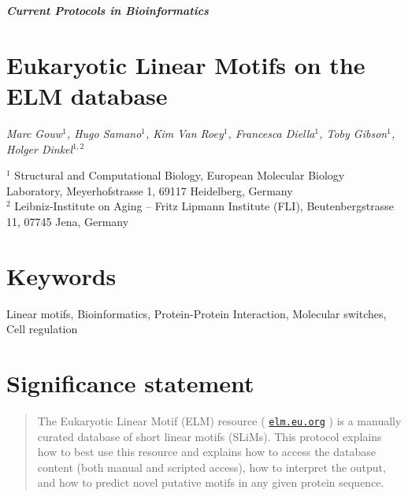 \documentclass[12pt]{article}
\newcounter{proto}
\newcommand\rurl[1]{%
	\href{http://#1}{\nolinkurl{#1}}%
}
\begin{document}

\thispagestyle{plain}
\begin{center}

\textbf{\LARGE \textit{Current Protocols in Bioinformatics}}\\\vspace{2mm}
\end{center}

\section*{Eukaryotic Linear Motifs on the ELM database}

{\small \it
Marc Gouw$^{1}$,
Hugo Samano$^{1}$,
Kim Van Roey$^{1}$,
Francesca Diella$^{1}$,
Toby Gibson$^{1}$,
Holger Dinkel$^{1,2}$

$^{1}$ Structural and Computational Biology, European Molecular Biology
Laboratory, Meyerhofstrasse 1, 69117 Heidelberg, Germany\\
$^{2}$ Leibniz-Institute on Aging -- Fritz Lipmann Institute (FLI),
Beutenbergstrasse 11, 07745 Jena, Germany
}

\section*{Keywords}

Linear motifs, Bioinformatics, Protein-Protein Interaction, Molecular
switches, Cell regulation

\section*{Significance statement}


\begin{abstract}


    The Eukaryotic Linear Motif (ELM) resource (\rurl{elm.eu.org}) is a
manually curated database of short linear motifs (SLiMs). This protocol
explains how to best use this resource and explains how to access the
database content (both manual and scripted access), how to interpret the
output, and how to predict novel putative motifs in any given protein
sequence.

\end{abstract}
\end{document}

